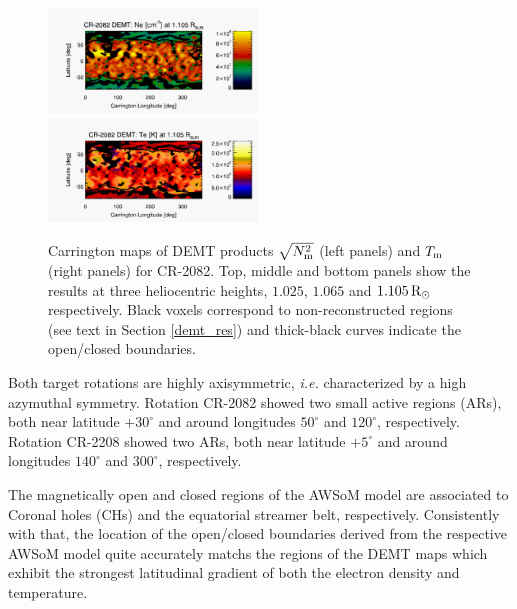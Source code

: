 \documentclass[namedreferences]{solarphysics}
\newcommand{\mdeg}{^\circ}
\newcommand{\mrsun}{{\rm R_\odot}}
\newcommand{\Tm}{T_{\rm m}}
\newcommand{\Nsqm}{N^2_{{\rm m}}}
\newcommand{\sqravgN}{\sqrt{\Nsqm}}
\begin{document}
\begin{article}
\begin{figure}[h!]
\begin{center}
\includegraphics[width=0.495\textwidth]{figs/map_Ne_CR2082_DEMT-EUVI_behind_H1-L3523_r3d_1105_Rsun.pdf}
\includegraphics[width=0.495\textwidth]{figs/map_Tm_CR2082_DEMT-EUVI_behind_H1-L3523_r3d_1105_Rsun.pdf}
\caption{Carrington maps of DEMT {products $\sqravgN$} (left panels) and $\Tm$ (right panels) for CR-2082. Top, middle and bottom panels show the results at three heliocentric heights, $1.025$, $1.065$ and $1.105\,\mrsun$ respectively. Black voxels correspond to non-reconstructed regions (see text in Section \ref{demt_res}) and thick-black curves indicate the open/closed boundaries.}
\label{carmaps_demt_2082}
\end{center}
\end{figure}

{Both target rotations are highly axisymmetric, \textit{i.e.} characterized by a high azymuthal symmetry. Rotation CR-2082} showed two {small} active regions (ARs), both near latitude $+30\mdeg$ and {around longitudes} $50\mdeg$ and $120\mdeg${, respectively}. {Rotation CR-2208} showed two {ARs, both near latitude} $+5\mdeg$ and {around longitudes $140\mdeg$ and $300\mdeg$, respectively.} 

{The magnetically open and closed regions of the AWSoM model are associated to Coronal holes (CHs) and the equatorial streamer belt, respectively. Consistently with that, the {location of the} open/closed boundaries derived from the respective AWSoM model quite accurately matchs {the regions of the DEMT maps which exhibit the strongest latitudinal gradient of both the electron density and temperature.}}


\end{article}
\end{document}
